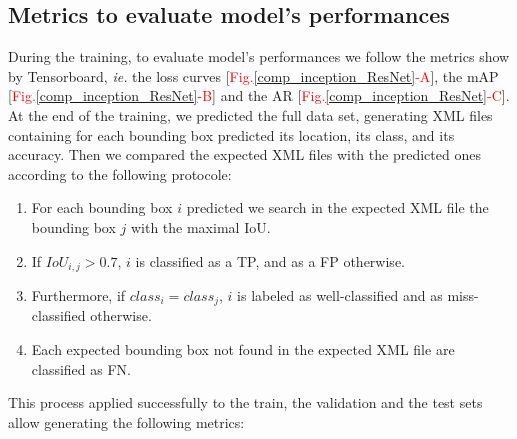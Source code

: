 \documentclass[12pt, french, a4paper]{article} %
\begin{document}
 \subsection{Metrics to evaluate model's performances}
 During the training, to evaluate model's performances we follow the metrics show by Tensorboard, \textit{ie.} the loss curves [\textcolor{red}{Fig.}\ref{comp_inception_ResNet}\textcolor{red}{-A}], the \gls{mAP} [\textcolor{red}{Fig.}\ref{comp_inception_ResNet}\textcolor{red}{-B}] and the \gls{AR} [\textcolor{red}{Fig.}\ref{comp_inception_ResNet}\textcolor{red}{-C}]. At the end of the training, we predicted the full data set, generating XML files containing for each bounding box predicted its location, its class, and its accuracy. Then we compared the expected XML files with the predicted ones according to the following protocole:
 \begin{enumerate}
 \itemsep0em 
  \item For each bounding box $i$ predicted we search in the expected XML file the bounding box $j$ with the maximal \gls{IoU}.
  \item If $IoU_{i,j}> 0.7$, $i$ is classified as a \gls{TP}, and as a \gls{FP} otherwise.
  \item Furthermore, if $class_i = class_j$, $i$ is labeled as well-classified and as miss-classified otherwise.
  \item Each expected bounding box not found in the expected XML file are classified as \gls{FN}.
 \end{enumerate}
This process applied successfully to the train, the validation and the test sets allow generating the following metrics:
\end{document}
